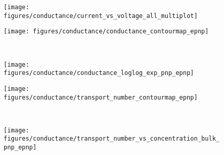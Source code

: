 \documentclass[twoside,twocolumn,9pt]{article}
\begin{document}
\begin{figure*}[!t]
  \centering
  \begin{minipage}[l]{16cm}
    \begin{minipage}[t]{5cm}
      \begin{subfigure}[t]{4.5cm}
        \centering
        \caption{}\vspace{-3mm}\label{fig:current-voltage_curves}
        \texttt{[image: figures/conductance/current\_vs\_voltage\_all\_multiplot]}
      \end{subfigure}
    \end{minipage}
    \begin{minipage}[t]{5cm}
      \begin{subfigure}[t]{5cm}
        \centering
        \caption{}\vspace{0mm}\label{fig:conductance_contourmap_epnp}
        \texttt{[image: figures/conductance/conductance\_contourmap\_epnp]}
      \end{subfigure}
      \\
      \begin{subfigure}[t]{5cm}
        \centering
        \caption{}\vspace{0mm}\label{fig:conductance_loglog_exp_pnp_epnp}
        \texttt{[image: figures/conductance/conductance\_loglog\_exp\_pnp\_epnp]}
      \end{subfigure}
    \end{minipage}
    \begin{minipage}[t]{5cm}
      \begin{subfigure}[t]{5cm}
        \centering
        \caption{}\vspace{0mm}\label{fig:transport_number_contourmap_epnp}
        \texttt{[image: figures/conductance/transport\_number\_contourmap\_epnp]}
      \end{subfigure}
      \\
      \begin{subfigure}[t]{5cm}
        \centering
        \caption{}\vspace{0mm}\label{fig:transport_number_vs_concentration_bulk_pnp_epnp}
        \texttt{[image: figures/conductance/transport\_number\_vs\_concentration\_bulk\_pnp\_epnp]}
      \end{subfigure}
    \end{minipage}
  \end{minipage}


\end{figure*}
\end{document}
